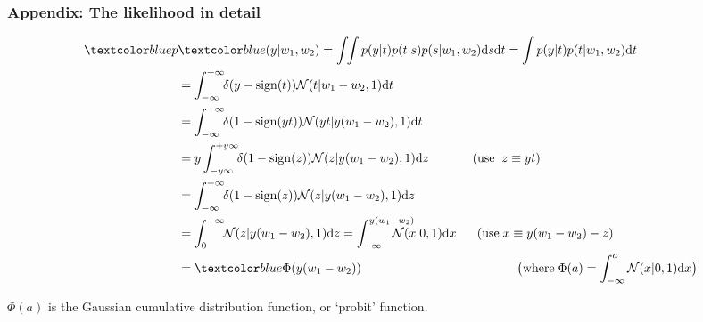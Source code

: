 \begin{frame}
\frametitle{Appendix: The likelihood in detail}

\begin{align*}
\Blue{p}&\Blue{(y|w_1,w_2)} = \int\!\!\int p(y|t)p(t|s)p(s|w_1,w_2)\mathrm{d}s\mathrm{d}t
= \int p(y|t)p(t|w_1,w_2)\mathrm{d}t\\
&= \int_{-\infty}^{+\infty}\!\! \delta(y-\operatorname{sign}(t))\N(t| w_1-w_2, 1
)\mathrm{d}t\\
&= \int_{-\infty}^{+\infty}\!\! \delta(1-\operatorname{sign}(y t))\N(y t| y(w_1-
w_2), 1)\mathrm{d}t\\
&= y \int_{-y\infty}^{+y\infty}\!\! \delta(1-\operatorname{sign}(z))\N(z| y(w_1-
w_2), 1)\mathrm{d}z
\;\;\;\;\;\;\;\;\;\;\;\;\, (\mathrm{use}\;\; z\equiv yt)\\
&= \int_{-\infty}^{+\infty}\!\! \delta(1-\operatorname{sign}(z))\N(z| y(w_1-w_2)
, 1)\mathrm{d}z\\
&= \int_{0}^{+\infty}\!\! \N(z| y(w_1-w_2), 1)\mathrm{d}z
= \int_{-\infty}^{y(w_1-w_2)} \!\!\!\!\!\!\!\!\!\!\!\!\N(x| 0, 1)\mathrm{d}x
\;\;\;\;\;\; (\mathrm{use}\; x\equiv y(w_1-w_2)-z)\\
&= \Blue{\Phi(y(w_1-w_2))}
\;\;\;\;\;\;\;\;\;\;\;\;\;\;\; 
\;\;\;\;\;\;\;\;\;\;\;\;\;\;\; 
\;\;\;\;\;\;\;\;\;\;\;\;\;\;\; 
\big(\mathrm{where}\; \Phi(a)=\int_{-\infty}^a \N(x| 0, 1)\mathrm{d}x\big)
\end{align*}

$\Phi(a)$ is the Gaussian cumulative distribution function, or `probit' function.

\end{frame}

